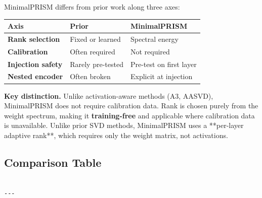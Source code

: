 MinimalPRISM differs from prior work along three axes:

\begin{table}[H]
\centering
\small
\begin{tabular}{lll}
\toprule
\textbf{Axis} & \textbf{Prior} & \textbf{MinimalPRISM} \\
\midrule
\textbf{Rank selection} & Fixed or learned & Spectral energy \\
\textbf{Calibration} & Often required & Not required \\
\textbf{Injection safety} & Rarely pre-tested & Pre-test on first layer \\
\textbf{Nested encoder} & Often broken & Explicit at injection \\
\bottomrule
\end{tabular}
\end{table}

\textbf{Key distinction.} Unlike activation-aware methods (A3, AASVD), MinimalPRISM 
does not require calibration data. Rank is chosen purely from the weight 
spectrum, making it \textbf{training-free} and applicable where calibration data 
is unavailable. Unlike prior SVD methods, MinimalPRISM uses a **per-layer 
adaptive rank**, which requires only the weight matrix, not activations.



\subsection{Comparison Table}

\begin{lstlisting}

---
\end{lstlisting}